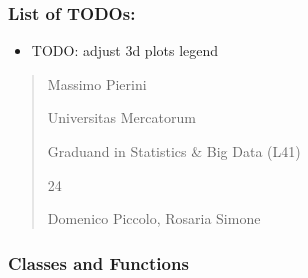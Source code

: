\documentclass[letterpaper,10pt,english]{sphinxmanual}
\begin{document}
\subsubsection{List of TODOs:}
\label{\detokenize{cubmods:id93}}\begin{itemize}
\item {} 
\sphinxAtStartPar
TODO: adjust 3d plots legend

\end{itemize}
\begin{quote}\begin{description}
\sphinxAtStartPar
Massimo Pierini

\sphinxAtStartPar
Universitas Mercatorum

\sphinxAtStartPar
Graduand in Statistics \& Big Data (L41)

\sphinxhyphen{}24

\sphinxAtStartPar
Domenico Piccolo, Rosaria Simone

\sphinxAtStartPar
{}

\end{description}\end{quote}


\subsubsection{Classes and Functions}
\label{\detokenize{cubmods:id94}}
\end{document}
